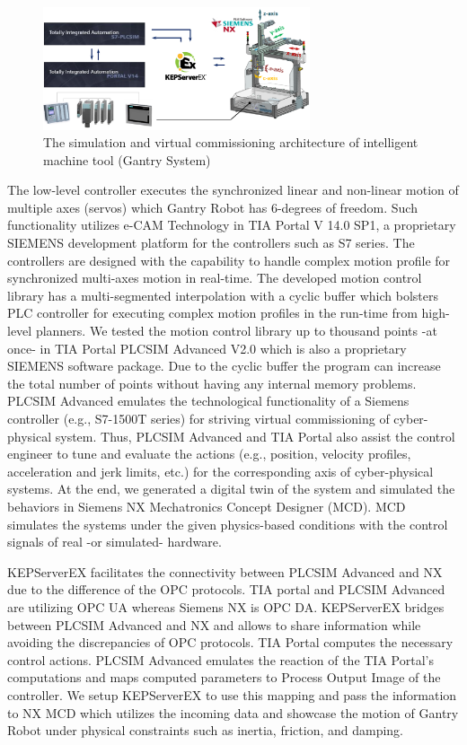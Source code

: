 \documentclass[3p,twocolumn,times,procedia]{elsarticle}
\begin{document}
\begin{figure}[t]\vspace*{4pt}
\center
\includegraphics[width=0.7\textwidth]{asr4_}
\caption{The simulation and virtual commissioning architecture of intelligent machine tool (Gantry System)}
\label{fig:asr4_}
\end{figure}

The low-level controller executes the synchronized linear and non-linear motion of multiple axes (servos) which Gantry Robot has 6-degrees of freedom. Such functionality utilizes e-CAM Technology in TIA Portal V 14.0 SP1, a proprietary SIEMENS development platform for the controllers such as S7 series. The controllers are designed with the capability to handle complex motion profile for synchronized multi-axes motion in real-time. The developed motion control library has a multi-segmented interpolation with a cyclic buffer which bolsters PLC controller for executing complex motion profiles in the run-time from high-level planners. We tested the motion control library up to thousand points -at once- in TIA Portal PLCSIM Advanced V2.0 which is also a proprietary SIEMENS software package. Due to the cyclic buffer the program can increase the total number of points without having any internal memory problems. PLCSIM Advanced emulates the technological functionality of a Siemens controller (e.g., S7-1500T series)\cite{plc_sim_adv} for striving virtual commissioning of cyber-physical system. Thus, PLCSIM Advanced and TIA Portal also assist the control engineer to tune and evaluate the actions (e.g., position, velocity profiles, acceleration and jerk limits, etc.) for the corresponding axis of cyber-physical systems. At the end, we generated a digital twin of the system and simulated the behaviors in Siemens NX Mechatronics Concept Designer (MCD). MCD simulates the systems under the given physics-based conditions with the control signals of real -or simulated- hardware.%

KEPServerEX facilitates the connectivity between PLCSIM Advanced and NX due to the difference of the OPC protocols. TIA portal and PLCSIM Advanced are utilizing OPC UA whereas Siemens NX is OPC DA. KEPServerEX bridges between PLCSIM Advanced and NX and allows to share information while avoiding the discrepancies of OPC protocols. TIA Portal computes the necessary control actions. PLCSIM Advanced emulates the reaction of the TIA Portal's computations and maps computed parameters to Process Output Image of the controller. We setup KEPServerEX to use this mapping and pass the information to NX MCD which utilizes the incoming data and showcase the motion of Gantry Robot under physical constraints such as inertia, friction, and damping.
\end{document}
